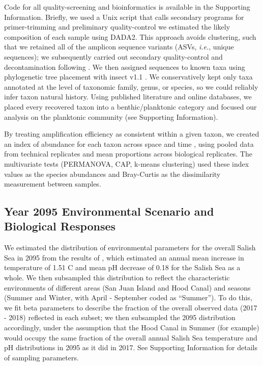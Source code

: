 \documentclass[11pt]{article}
\begin{document}
\begin{linenumbers}
Code for all quality-screening and bioinformatics is available in the Supporting Information. Briefly, we used a Unix script that calls secondary programs for primer-trimming and preliminary quality-control \cite{martin2011cutadapt, Callahan:2016aa} we estimated the likely composition of each sample using DADA2. This approach avoids clustering, such that we retained all of the amplicon sequence variants (ASVs, \textit{i.e.}, unique sequences); we subsequently carried out secondary quality-control and decontamination following \cite{kelly2018tides}. We then assigned sequences to known taxa using phylogenetic tree placement with insect v1.1 \cite{insect}. We conservatively kept only taxa annotated at the level of taxonomic family, genus, or species, so we could reliably infer taxon natural history. Using published literature and online databases, we placed every recovered taxon into a benthic/planktonic category and focused our analysis on the planktonic community (see Supporting Information).

By treating amplification efficiency as consistent within a given taxon, we created an index of abundance for each taxon across space and time \cite{kelly2019understanding}, using pooled data from technical replicates and mean proportions across biological replicates. The multivariate tests (PERMANOVA, CAP, k-means clustering) used these index values as the species abundances and Bray-Curtis as the dissimilarity measurement between samples. 

\subsection*{Year 2095 Environmental Scenario and Biological Responses}

We estimated the distribution of environmental parameters for the overall Salish Sea in 2095 from the results of \cite{khangaonkar2019salish}, which estimated an annual mean increase in temperature of 1.51 \textdegree C and mean pH decrease of 0.18 for the Salish Sea as a whole. We then subsampled this distribution to reflect the characteristic environments of different areas (San Juan Island and Hood Canal) and seasons (Summer and Winter, with April - September coded as ``Summer''). To do this, we fit beta parameters to describe the fraction of the overall observed data (2017 - 2018) reflected in each subset; we then subsampled the 2095 distribution accordingly, under the assumption that the Hood Canal in Summer (for example) would occupy the same fraction of the overall annual Salish Sea temperature and pH distributions in 2095 as it did in 2017. See Supporting Information for details of sampling parameters. 


\end{linenumbers}
\end{document}
